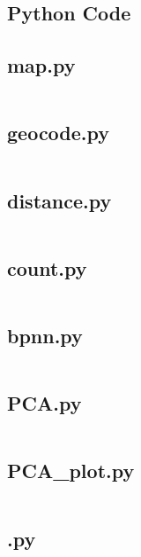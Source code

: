 \documentclass{mcmthesis}
\begin{document}
\begin{appendices}

\section{Python Code}

\subsection{map.py}\label{code:map}
\inputminted{python}{../src/map.py}

\subsection{geocode.py}\label{code:geocode}
\inputminted{python}{../src/geocode.py}

\subsection{distance.py}\label{code:distance}
\inputminted{python}{../src/distance.py}

\subsection{count.py} \label{code:count}
\inputminted{python}{../src/count.py}

\subsection{bpnn.py} \label{code:bpnn}
\inputminted{python}{../src/bpnn.py}

\subsection{PCA.py} \label{code:PCA}
\inputminted{python}{../src/PCA.py}

\subsection{PCA\_plot.py} \label{code:PCA_plot}
\inputminted{python}{../src/PCA_plot.py}

\subsection{.py}\label{}
\inputminted{python}{../src/.py}


\end{appendices}
\end{document}

